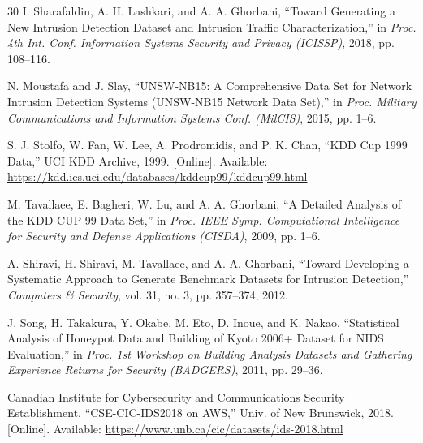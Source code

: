 \documentclass[conference]{IEEEtran}
\begin{document}
\begin{thebibliography}{30}
I. Sharafaldin, A. H. Lashkari, and A. A. Ghorbani, ``Toward Generating a New Intrusion Detection Dataset and Intrusion Traffic Characterization,'' in \textit{Proc. 4th Int. Conf. Information Systems Security and Privacy (ICISSP)}, 2018, pp. 108--116.

N. Moustafa and J. Slay, ``UNSW-NB15: A Comprehensive Data Set for Network Intrusion Detection Systems (UNSW-NB15 Network Data Set),'' in \textit{Proc. Military Communications and Information Systems Conf. (MilCIS)}, 2015, pp. 1--6.

S. J. Stolfo, W. Fan, W. Lee, A. Prodromidis, and P. K. Chan, ``KDD Cup 1999 Data,'' UCI KDD Archive, 1999. [Online]. Available: \url{https://kdd.ics.uci.edu/databases/kddcup99/kddcup99.html}

M. Tavallaee, E. Bagheri, W. Lu, and A. A. Ghorbani, ``A Detailed Analysis of the KDD CUP 99 Data Set,'' in \textit{Proc. IEEE Symp. Computational Intelligence for Security and Defense Applications (CISDA)}, 2009, pp. 1--6.

A. Shiravi, H. Shiravi, M. Tavallaee, and A. A. Ghorbani, ``Toward Developing a Systematic Approach to Generate Benchmark Datasets for Intrusion Detection,'' \textit{Computers \& Security}, vol. 31, no. 3, pp. 357--374, 2012.

J. Song, H. Takakura, Y. Okabe, M. Eto, D. Inoue, and K. Nakao, ``Statistical Analysis of Honeypot Data and Building of Kyoto 2006+ Dataset for NIDS Evaluation,'' in \textit{Proc. 1st Workshop on Building Analysis Datasets and Gathering Experience Returns for Security (BADGERS)}, 2011, pp. 29--36.

Canadian Institute for Cybersecurity and Communications Security Establishment, ``CSE-CIC-IDS2018 on AWS,'' Univ. of New Brunswick, 2018. [Online]. Available: \url{https://www.unb.ca/cic/datasets/ids-2018.html}

\end{thebibliography}
\end{document}
